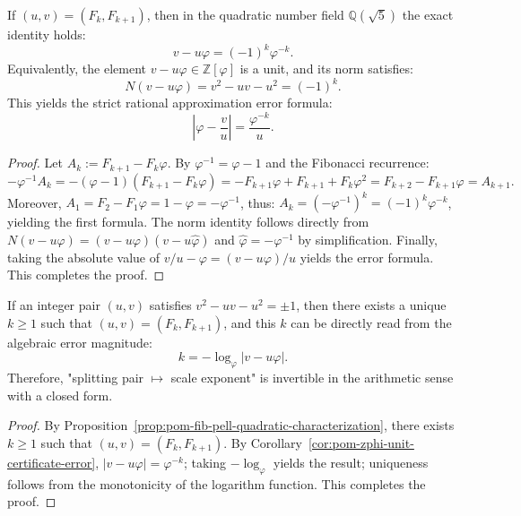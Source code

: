 \begin{corollary}\label{cor:pom-zphi-unit-certificate-error}
If $(u,v)=(F_k,F_{k+1})$, then in the quadratic number field $\mathbb{Q}(\sqrt5)$ the exact identity holds:
\[
\boxed{\;v-u\varphi=(-1)^k\varphi^{-k}.\;}
\]
Equivalently, the element $v-u\varphi\in\mathbb{Z}[\varphi]$ is a unit, and its norm satisfies:
\[
\boxed{\;N(v-u\varphi)=v^2-uv-u^2=(-1)^k.\;}
\]
This yields the strict rational approximation error formula:
\[
\boxed{\;\left|\varphi-\frac{v}{u}\right|=\frac{\varphi^{-k}}{u}.\;}
\]
\end{corollary}
\begin{proof}
Let $A_k:=F_{k+1}-F_k\varphi$.
By $\varphi^{-1}=\varphi-1$ and the Fibonacci recurrence:
\[
-\varphi^{-1}A_k=-(\varphi-1)(F_{k+1}-F_k\varphi)
=-F_{k+1}\varphi+F_{k+1}+F_k\varphi^2
=F_{k+2}-F_{k+1}\varphi
=A_{k+1}.
\]
Moreover, $A_1=F_2-F_1\varphi=1-\varphi=-\varphi^{-1}$, thus:
\(
A_k=(-\varphi^{-1})^{k}=(-1)^k\varphi^{-k}
\),
yielding the first formula.
The norm identity follows directly from $N(v-u\varphi)=(v-u\varphi)(v-u\widehat\varphi)$ and $\widehat\varphi=-\varphi^{-1}$ by simplification.
Finally, taking the absolute value of $v/u-\varphi=(v-u\varphi)/u$ yields the error formula. This completes the proof.
\end{proof}
\begin{corollary}\label{cor:pom-recover-k-from-unit-error}
If an integer pair $(u,v)$ satisfies $v^2-uv-u^2=\pm 1$, then there exists a unique $k\ge 1$ such that $(u,v)=(F_k,F_{k+1})$, and this $k$ can be directly read from the algebraic error magnitude:
\[
\boxed{\;k=-\log_\varphi|v-u\varphi|.\;}
\]
Therefore, "splitting pair $\mapsto$ scale exponent" is invertible in the arithmetic sense with a closed form.
\end{corollary}
\begin{proof}
By Proposition~\ref{prop:pom-fib-pell-quadratic-characterization}, there exists $k\ge 1$ such that $(u,v)=(F_k,F_{k+1})$.
By Corollary~\ref{cor:pom-zphi-unit-certificate-error},
\(
|v-u\varphi|=\varphi^{-k}
\);
taking $-\log_\varphi$ yields the result; uniqueness follows from the monotonicity of the logarithm function. This completes the proof.
\end{proof}
